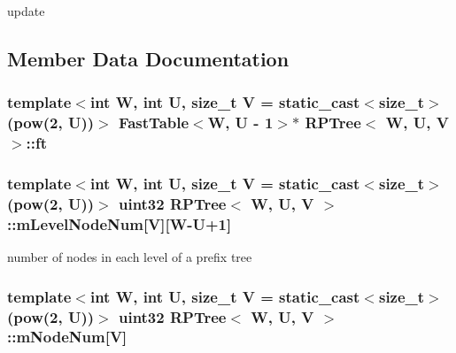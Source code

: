 update 



\subsection{Member Data Documentation}
\hypertarget{classRPTree_a80b8fb3d3fd9c8165fb9fc676adf6827}{
\subsubsection[{ft}]{\setlength{\rightskip}{0pt plus 5cm}template$<$int W, int U, size\-\_\-t V = static\-\_\-cast$<$size\-\_\-t$>$(pow(2, U))$>$ {\bf Fast\-Table}$<${\bf W}, U -\/ 1$>$$\ast$ {\bf R\-P\-Tree}$<$ {\bf W}, U, V $>$\-::ft\hspace{0.3cm}{\ttfamily [private]}}}\label{classRPTree_a80b8fb3d3fd9c8165fb9fc676adf6827}
\hypertarget{classRPTree_a1bfeccd1394ac4b6f9b706e67f9baeeb}{
\subsubsection[{m\-Level\-Node\-Num}]{\setlength{\rightskip}{0pt plus 5cm}template$<$int W, int U, size\-\_\-t V = static\-\_\-cast$<$size\-\_\-t$>$(pow(2, U))$>$ {\bf uint32} {\bf R\-P\-Tree}$<$ {\bf W}, U, V $>$\-::m\-Level\-Node\-Num\mbox{[}V\mbox{]}\mbox{[}{\bf W}-\/U+1\mbox{]}\hspace{0.3cm}{\ttfamily [private]}}}\label{classRPTree_a1bfeccd1394ac4b6f9b706e67f9baeeb}


number of nodes in each level of a prefix tree 

\hypertarget{classRPTree_ac0a0d943c46eb483758b0c411e596bac}{
\subsubsection[{m\-Node\-Num}]{\setlength{\rightskip}{0pt plus 5cm}template$<$int W, int U, size\-\_\-t V = static\-\_\-cast$<$size\-\_\-t$>$(pow(2, U))$>$ {\bf uint32} {\bf R\-P\-Tree}$<$ {\bf W}, U, V $>$\-::m\-Node\-Num\mbox{[}V\mbox{]}\hspace{0.3cm}{\ttfamily [private]}}}\label{classRPTree_ac0a0d943c46eb483758b0c411e596bac}


